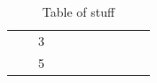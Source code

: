 \begin{table}[t]
\begin{tabular}{*{10}{|c}|c|}
                              &                            & 3                                 &                                        &                                     &                                &                                   &            &            &   & \\
                              &                            & 5                                 &                                        &                                     &                                &                                   &            &            &   & \\
    \hline
  \end{tabular}
  \caption{Table of stuff}
  \label{tab:comparison}
\end{table}